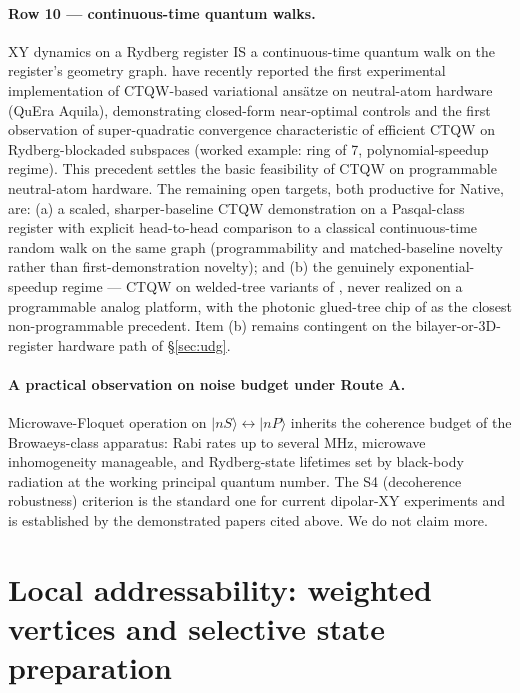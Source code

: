 \documentclass[10pt]{article}
\begin{document}
\paragraph{Row 10 --- continuous-time quantum walks.}
XY dynamics on a Rydberg register IS a continuous-time quantum walk \cite{farhi1998quantum} on the register's geometry graph. \citet{matwiejew2025ctqw} have recently reported the first experimental implementation of CTQW-based variational ansätze on neutral-atom hardware (QuEra Aquila), demonstrating closed-form near-optimal controls and the first observation of super-quadratic convergence characteristic of efficient CTQW on Rydberg-blockaded subspaces (worked example: ring of 7, polynomial-speedup regime). This precedent settles the basic feasibility of CTQW on programmable neutral-atom hardware. The remaining open targets, both productive for Native, are: (a) a scaled, sharper-baseline CTQW demonstration on a Pasqal-class register with explicit head-to-head comparison to a classical continuous-time random walk on the same graph (programmability and matched-baseline novelty rather than first-demonstration novelty); and (b) the genuinely exponential-speedup regime --- CTQW on welded-tree variants of \citet{childs2003exponential}, never realized on a programmable analog platform, with the photonic glued-tree chip of \citet{tang2018photonic_welded} as the closest non-programmable precedent. Item (b) remains contingent on the bilayer-or-3D-register hardware path of \S\ref{sec:udg}.

\paragraph{A practical observation on noise budget under Route A.}
Microwave-Floquet operation on $|nS\rangle \leftrightarrow |nP\rangle$ inherits the coherence budget of the Browaeys-class apparatus: Rabi rates up to several MHz, microwave inhomogeneity manageable, and Rydberg-state lifetimes set by black-body radiation at the working principal quantum number. The S4 (decoherence robustness) criterion is the standard one for current dipolar-XY experiments and is established by the demonstrated papers cited above. We do not claim more.

\section{Local addressability: weighted vertices and selective state preparation}\label{sec:local}
\end{document}
